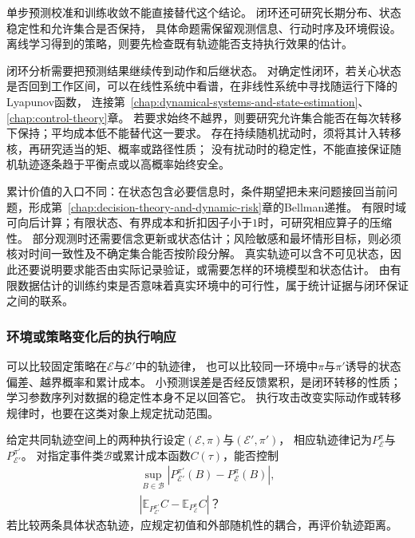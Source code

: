 单步预测校准和训练收敛不能直接替代这个结论。
闭环还可研究长期分布、状态稳定性和允许集合是否保持，
具体命题需保留观测信息、行动时序及环境假设。
离线学习得到的策略，则要先检查既有轨迹能否支持执行效果的估计。

闭环分析需要把预测结果继续传到动作和后继状态。
对确定性闭环，若关心状态是否回到工作区间，可以在线性系统中看谱，在非线性系统中寻找随运行下降的Lyapunov函数，
连接第~\ref{chap:dynamical-systems-and-state-estimation}、\ref{chap:control-theory}章。
若要求始终不越界，则要研究允许集合能否在每次转移下保持；平均成本低不能替代这一要求。
存在持续随机扰动时，须将其计入转移核，再研究适当的矩、概率或路径性质；
没有扰动时的稳定性，不能直接保证随机轨迹逐条趋于平衡点或以高概率始终安全。

累计价值的入口不同：在状态包含必要信息时，条件期望把未来问题接回当前问题，形成第~\ref{chap:decision-theory-and-dynamic-risk}章的Bellman递推。
有限时域可向后计算；有限状态、有界成本和折扣因子小于$1$时，可研究相应算子的压缩性。
部分观测时还需要信念更新或状态估计；风险敏感和最坏情形目标，则必须核对时间一致性及不确定集合能否按阶段分解。
真实轨迹可以含不可见状态，因此还要说明要求能否由实际记录验证，或需要怎样的环境模型和状态估计。
由有限数据估计的训练约束是否意味着真实环境中的可行性，属于统计证据与闭环保证之间的联系。

\subsubsection{环境或策略变化后的执行响应}
\label{sec:future-analysis-trajectory-perturbation}

可以比较固定策略在$\mathcal E$与$\mathcal E'$中的轨迹律，
也可以比较同一环境中$\pi$与$\pi'$诱导的状态偏差、越界概率和累计成本。
小预测误差是否经反馈累积，是闭环转移的性质；
学习参数序列对数据的稳定性本身不足以回答它。
执行攻击改变实际动作或转移规律时，也要在这类对象上规定扰动范围。

\begin{mathproblem}[闭环过程对环境与策略变化的响应]
  \label{question:future-trajectory-perturbation}
  给定共同轨迹空间上的两种执行设定$(\mathcal E,\pi)$与$(\mathcal E',\pi')$，
  相应轨迹律记为$P_{\mathcal E}^{\pi}$与$P_{\mathcal E'}^{\pi'}$。
  对指定事件类$\mathcal B$或累计成本函数$C(\tau)$，能否控制
  \[
    \begin{gathered}
      \sup_{B\in\mathcal B}
        |P_{\mathcal E'}^{\pi'}(B)-P_{\mathcal E}^{\pi}(B)|,\\
      |\mathbb E_{P_{\mathcal E'}^{\pi'}}C
       -\mathbb E_{P_{\mathcal E}^{\pi}}C|\text{？}
    \end{gathered}
  \]
  若比较两条具体状态轨迹，应规定初值和外部随机性的耦合，再评价轨迹距离。
\end{mathproblem}

